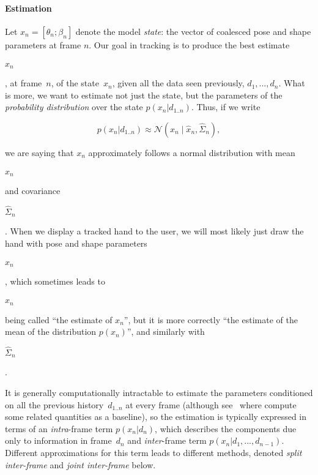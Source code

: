 \paragraph{Estimation}
Let $x_n = [\theta_n; \beta_n]$ denote the model {\em state}: the vector of coalesced pose and shape parameters at frame $n$.  
Our goal in tracking is to produce the best estimate \begin{edit}$\hat{x}_n$\end{edit}, at frame~$n$, of the state~$x_n$, given all the data seen previously, $d_1, ..., d_n$.
What is more, we want to estimate not just the state, but the parameters of the {\em probability distribution} over the state $p(x_n|d_{1..n})$.  Thus, if we write
\begin{edit}
\begin{equation}
p(x_n|d_{1..n}) \approx \mathcal N(x_n \mid \hat{x}_n, \hat{\Sigma}_n),
\end{equation}
\end{edit}
we are saying that $x_n$ approximately follows a normal distribution with mean ~\begin{edit} $\hat x_n$ \end{edit} and covariance~\begin{edit}$\hat\Sigma_n$ \end{edit}.  When we display a tracked hand to the user, we will most likely just draw the hand with pose and shape parameters~\begin{edit}$\hat x_n$ \end{edit}, which sometimes leads to~\begin{edit}$\hat x_n$ \end{edit} being called ``the estimate of $x_n$'', but it is more correctly ``the estimate of the mean of the distribution $p(x_n)$'', and similarly with~\begin{edit}$\hat\Sigma_n$ \end{edit}.

It is generally computationally intractable to estimate the parameters conditioned on all the previous history~$d_{1..n}$ at every frame (although see~ where compute some related quantities as a baseline), so the estimation is typically expressed in terms of an {\em intra}-frame term $p(x_n|d_n)$, which describes the components due only to information in frame~$d_n$ and {\em inter}-frame term $p(x_n|d_1, ..., d_{n-1})$.  Different approximations for this term leads to different methods, denoted {\em split inter-frame} and {\em joint inter-frame} below.

